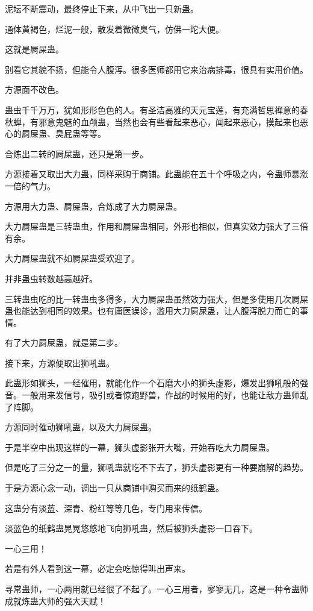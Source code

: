 \begin{this_body}
泥坛不断震动，最终停止下来，从中飞出一只新蛊。

通体黄褐色，烂泥一般，散发着微微臭气，仿佛一坨大便。

这就是屙屎蛊。

别看它其貌不扬，但能令人腹泻。很多医师都用它来治病排毒，很具有实用价值。

方源面不改色。

蛊虫千千万万，犹如形形色色的人。有圣洁高雅的天元宝莲，有充满哲思禅意的春秋蝉，有邪意鬼魅的血颅蛊，当然也会有些看起来恶心，闻起来恶心，摸起来也恶心的屙屎蛊、臭屁蛊等等。

合炼出二转的屙屎蛊，还只是第一步。

方源接着又取出大力蛊，同样采购于商铺。此蛊能在五十个呼吸之内，令蛊师暴涨一倍的气力。

方源用大力蛊、屙屎蛊，合炼成了大力屙屎蛊。

大力屙屎蛊是三转蛊虫，作用和屙屎蛊相同，外形也相似，但真实效力强大了三倍有余。

大力屙屎蛊就不如屙屎蛊受欢迎了。

并非蛊虫转数越高越好。

三转蛊虫吃的比一转蛊虫多得多，大力屙屎蛊虽然效力强大，但是多使用几次屙屎蛊也能达到相同的效果。也有庸医误诊，滥用大力屙屎蛊，让人腹泻脱力而亡的事情。

有了大力屙屎蛊，就是第二步。

接下来，方源便取出狮吼蛊。

此蛊形如狮头，一经催用，就能化作一个石磨大小的狮头虚影，爆发出狮吼般的强音。一般用来发信号，吸引或者惊跑野兽，作战的时候用的好，也能让敌方蛊师乱了阵脚。

方源同时催动狮吼蛊，以及大力屙屎蛊。

于是半空中出现这样的一幕，狮头虚影张开大嘴，开始吞吃大力屙屎蛊。

但是吃了三分之一的量，狮吼蛊就吃不下去了，狮头虚影更有一种要崩解的趋势。

于是方源心念一动，调出一只从商铺中购买而来的纸鹤蛊。

这蛊分有淡蓝、深青、粉红等等几色，专门用来传信。

淡蓝色的纸鹤蛊晃晃悠悠地飞向狮吼蛊，然后被狮头虚影一口吞下。

一心三用！

若是有外人看到这一幕，必定会吃惊得叫出声来。

寻常蛊师，一心两用就已经很了不起了。一心三用者，寥寥无几，这是一种令蛊师成就炼蛊大师的强大天赋！


\end{this_body}
